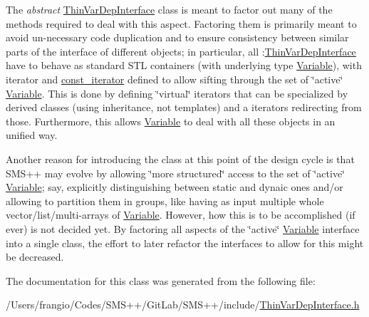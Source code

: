 The {\itshape abstract} \mbox{\hyperlink{class_s_m_spp__di__unipi__it_1_1_thin_var_dep_interface}{Thin\+Var\+Dep\+Interface}} class is meant to factor out many of the methods required to deal with this aspect. Factoring them is primarily meant to avoid un-\/necessary code duplication and to ensure consistency between similar parts of the interface of different objects; in particular, all \+:\mbox{\hyperlink{class_s_m_spp__di__unipi__it_1_1_thin_var_dep_interface}{Thin\+Var\+Dep\+Interface}} have to behave as standard S\+TL containers (with underlying type \mbox{\hyperlink{class_s_m_spp__di__unipi__it_1_1_variable}{Variable}}), with iterator and \mbox{\hyperlink{class_s_m_spp__di__unipi__it_1_1_thin_var_dep_interface_1_1const__iterator}{const\+\_\+iterator}} defined to allow sifting through the set of \char`\"{}active\char`\"{} \mbox{\hyperlink{class_s_m_spp__di__unipi__it_1_1_variable}{Variable}}. This is done by defining \char`\"{}virtual\char`\"{} iterators that can be specialized by derived classes (using inheritance, not templates) and a iterators redirecting from those. Furthermore, this allows \mbox{\hyperlink{class_s_m_spp__di__unipi__it_1_1_variable}{Variable}} to deal with all these objects in an unified way.

Another reason for introducing the class at this point of the design cycle is that S\+M\+S++ may evolve by allowing \char`\"{}more structured\char`\"{} access to the set of \char`\"{}active\char`\"{} \mbox{\hyperlink{class_s_m_spp__di__unipi__it_1_1_variable}{Variable}}; say, explicitly distinguishing between static and dynaic ones and/or allowing to partition them in groups, like having as input multiple whole vector/list/multi-\/arrays of \mbox{\hyperlink{class_s_m_spp__di__unipi__it_1_1_variable}{Variable}}. However, how this is to be accomplished (if ever) is not decided yet. By factoring all aspects of the \char`\"{}active\char`\"{} \mbox{\hyperlink{class_s_m_spp__di__unipi__it_1_1_variable}{Variable}} interface into a single class, the effort to later refactor the interfaces to allow for this might be decreased. 

The documentation for this class was generated from the following file\+:\begin{DoxyCompactItemize}
\item 
/\+Users/frangio/\+Codes/\+S\+M\+S++/\+Git\+Lab/\+S\+M\+S++/include/\mbox{\hyperlink{_thin_var_dep_interface_8h}{Thin\+Var\+Dep\+Interface.\+h}}\end{DoxyCompactItemize}
